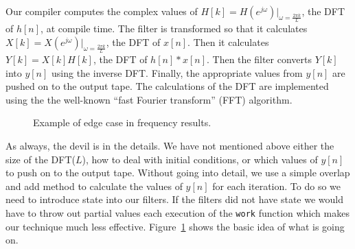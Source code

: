 Our compiler computes the complex values of $H[k]=H(e^{j\omega})|_{\omega=\frac{2{\pi}k}{L}}$, 
the DFT of $h[n]$, at compile time. The filter is transformed 
so that it  calculates $X[k]=X(e^{j\omega})|_{\omega=\frac{2{\pi}k}{L}}$, the DFT 
of $x[n]$. Then it calculates $Y[k]=X[k]H[k]$, the DFT of $h[n]*x[n]$.
Then the filter converts $Y[k]$ into $y[n]$ using the inverse DFT. Finally, 
the appropriate values from $y[n]$ are pushed on to the output tape. The
calculations of the DFT are implemented using the the well-known 
``fast Fourier transform'' (FFT) algorithm.

\begin{figure}
\center
\epsfxsize=3.0in
\caption{Example of edge case in frequency results.}
\label{fig:frequency-example}
\end{figure}

As always, the devil is in the details. We have not mentioned above either 
the size of the DFT($L$), how to deal with initial conditions, or which 
values of $y[n]$ to push on to the output tape. 
Without going into detail, we use a simple overlap and add\cite{oppenheim-discrete} 
method to calculate the values of $y[n]$ for each iteration. To do so 
we need to introduce state into our filters. If the filters did not have state
we would have to throw out partial values each execution of the {\tt work} function
which makes our technique much less effective. Figure~\ref{fig:frequency-example} shows
the basic idea of what is going on.


